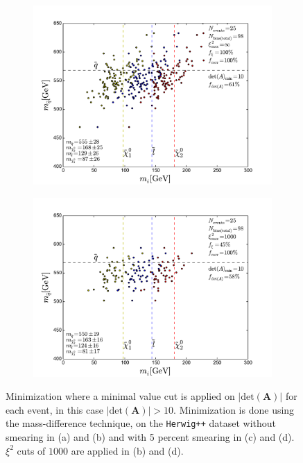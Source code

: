 \documentclass[twoside,english]{uiofysmaster}
\begin{document}
\begin{figure}[hbt]
	\begin{subfigure}[b]{0.45\textwidth}
		\includegraphics[width=\textwidth]{figures/improving_combinatorics/herwigpp-5psmear-4combosum-detAcut_10-xisqcut_none-nocomb-TMP.pdf} 
		\caption{ }
		\label{fig:detAcut_c}
	\end{subfigure}
	\begin{subfigure}[b]{0.45\textwidth}
		\includegraphics[width=\textwidth]{figures/improving_combinatorics/herwigpp-5psmear-4combosum-detAcut_10-xisqcut_1000-nocomb-TMP.pdf}
		\caption{ } 
		\label{fig:detAcut_d}
	\end{subfigure}
	\caption{Minimization where a minimal value cut is applied on $|\mathrm{det}(\mathbf A)|$ for each event, in this case $|\mathrm{det}(\mathbf A)|>10$. Minimization is done using the mass-difference technique, on the {\tt Herwig++} dataset without smearing in (a) and (b) and with 5 percent smearing in (c) and (d). $\xi^2$ cuts of $1000$ are applied in (b) and (d).}
	\label{fig:detAcut}
\end{figure}
\end{document}
